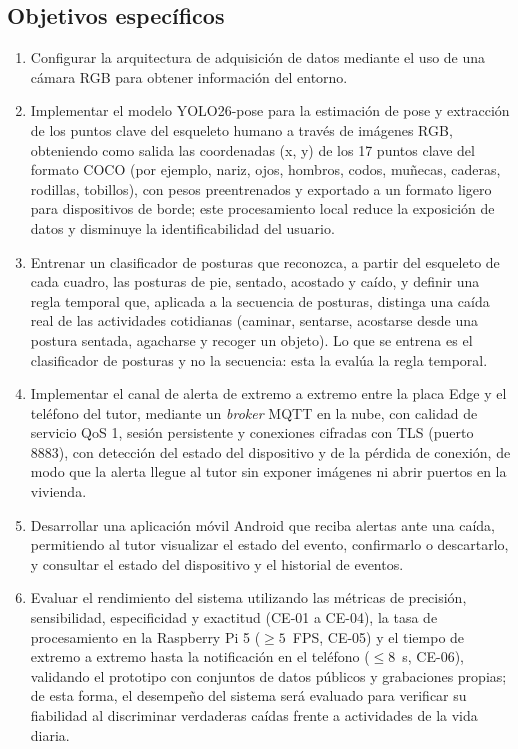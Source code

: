 \documentclass[12pt,a4paper,oneside]{book}
\theoremstyle{plain}
\theoremstyle{definition}
\theoremstyle{remark}
\begin{document}
\subsection{Objetivos específicos}
\begin{enumerate}
    \item Configurar la arquitectura de adquisición de datos mediante el uso de una cámara RGB para obtener información del entorno.

    \item Implementar el modelo YOLO26-pose \parencite{ultralytics2026yolo26} para la estimación de pose y extracción de los puntos clave del esqueleto humano a través de imágenes RGB, obteniendo como salida las coordenadas (x, y) de los 17 puntos clave del formato COCO (por ejemplo, nariz, ojos, hombros, codos, muñecas, caderas, rodillas, tobillos), con pesos preentrenados y exportado a un formato ligero para dispositivos de borde; este procesamiento local reduce la exposición de datos y disminuye la identificabilidad del usuario.
 
    \item Entrenar un clasificador de posturas que reconozca, a partir del esqueleto de cada cuadro, las posturas de pie, sentado, acostado y caído, y definir una regla temporal que, aplicada a la secuencia de posturas, distinga una caída real de las actividades cotidianas (caminar, sentarse, acostarse desde una postura sentada, agacharse y recoger un objeto). Lo que se entrena es el clasificador de posturas y no la secuencia: esta la evalúa la regla temporal.

    \item Implementar el canal de alerta de extremo a extremo entre la placa Edge y el teléfono del tutor, mediante un \textit{broker} MQTT en la nube, con calidad de servicio QoS 1, sesión persistente y conexiones cifradas con TLS (puerto 8883), con detección del estado del dispositivo y de la pérdida de conexión, de modo que la alerta llegue al tutor sin exponer imágenes ni abrir puertos en la vivienda.
 
    \item Desarrollar una aplicación móvil Android que reciba alertas ante una caída, permitiendo al tutor visualizar el estado del evento, confirmarlo o descartarlo, y consultar el estado del dispositivo y el historial de eventos.

    \item Evaluar el rendimiento del sistema utilizando las métricas de precisión, sensibilidad, especificidad y exactitud (CE-01 a CE-04), la tasa de procesamiento en la Raspberry Pi 5 ($\geq 5$~FPS, CE-05) y el tiempo de extremo a extremo hasta la notificación en el teléfono ($\leq 8$~s, CE-06), validando el prototipo con conjuntos de datos públicos y grabaciones propias; de esta forma, el desempeño del sistema será evaluado para verificar su fiabilidad al discriminar verdaderas caídas frente a actividades de la vida diaria.
\end{enumerate}
\end{document}
